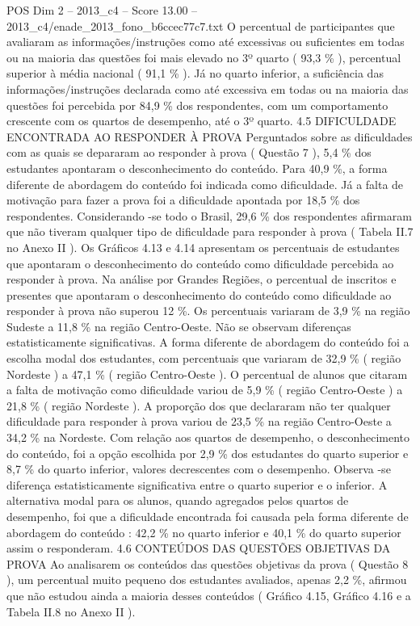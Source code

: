 \begin{textsample}{POS Dim 2 – 2013\_c4 – Score 13.00 – 2013\_c4/enade\_2013\_fono\_b6ccec77c7.txt}
O percentual de participantes que avaliaram as informações/instruções como até excessivas ou suficientes em todas ou na maioria das questões foi mais elevado no 3º quarto ( 93,3 \% ), percentual superior à média nacional ( 91,1 \% ).
Já no quarto inferior, a suficiência das informações/instruções declarada como até excessiva em todas ou na maioria das questões foi percebida por 84,9 \% dos respondentes, com um comportamento crescente com os quartos de desempenho, até o 3º quarto. 4.5 DIFICULDADE ENCONTRADA AO RESPONDER À PROVA Perguntados sobre as dificuldades com as quais se depararam ao responder à prova ( Questão 7 ), 5,4 \% dos estudantes apontaram o desconhecimento do conteúdo.
Para 40,9 \%, a forma diferente de abordagem do conteúdo foi indicada como dificuldade.
Já a falta de motivação para fazer a prova foi a dificuldade apontada por 18,5 \% dos respondentes.
Considerando -se todo o Brasil, 29,6 \% dos respondentes afirmaram que não tiveram qualquer tipo de dificuldade para responder à prova ( Tabela II.7 no Anexo II ).
Os Gráficos 4.13 e 4.14 apresentam os percentuais de estudantes que apontaram o desconhecimento do conteúdo como dificuldade percebida ao responder à prova.
Na análise por Grandes Regiões, o percentual de inscritos e presentes que apontaram o desconhecimento do conteúdo como dificuldade ao responder à prova não superou 12 \%.
Os percentuais variaram de 3,9 \% na região Sudeste a 11,8 \% na região Centro-Oeste.
Não se observam diferenças estatisticamente significativas.
A forma diferente de abordagem do conteúdo foi a escolha modal dos estudantes, com percentuais que variaram de 32,9 \% ( região Nordeste ) a 47,1 \% ( região Centro-Oeste ).
O percentual de alunos que citaram a falta de motivação como dificuldade variou de 5,9 \% ( região Centro-Oeste ) a 21,8 \% ( região Nordeste ).
A proporção dos que declararam não ter qualquer dificuldade para responder à prova variou de 23,5 \% na região Centro-Oeste a 34,2 \% na Nordeste.
Com relação aos quartos de desempenho, o desconhecimento do conteúdo, foi a opção escolhida por 2,9 \% dos estudantes do quarto superior e 8,7 \% do quarto inferior, valores decrescentes com o desempenho.
Observa -se diferença estatisticamente significativa entre o quarto superior e o inferior.
A alternativa modal para os alunos, quando agregados pelos quartos de desempenho, foi que a dificuldade encontrada foi causada pela forma diferente de abordagem do conteúdo : 42,2 \% no quarto inferior e 40,1 \% do quarto superior assim o responderam. 4.6 CONTEÚDOS DAS QUESTÕES OBJETIVAS DA PROVA Ao analisarem os conteúdos das questões objetivas da prova ( Questão 8 ), um percentual muito pequeno dos estudantes avaliados, apenas 2,2 \%, afirmou que não estudou ainda a maioria desses conteúdos ( Gráfico 4.15, Gráfico 4.16 e a Tabela II.8 no Anexo II ).

\end{textsample}
